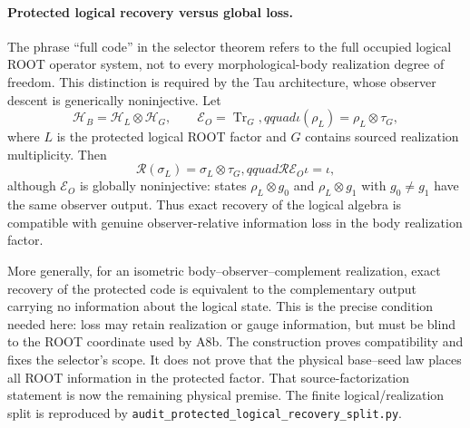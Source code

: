 \paragraph{Protected logical recovery versus global loss.}
The phrase ``full code'' in the selector theorem refers to the full occupied
logical ROOT operator system, not to every morphological-body realization
degree of freedom. This distinction is required by the Tau architecture,
whose observer descent is generically noninjective. Let
\begin{equation}
 \mathcal H_B=\mathcal H_L\otimes\mathcal H_G,\qquad
 \mathcal E_O=\operatorname{Tr}_G,qquad
 \iota(\rho_L)=\rho_L\otimes\tau_G,
 \label{eq:protectedfactor}
\end{equation}
where $L$ is the protected logical ROOT factor and $G$ contains sourced
realization multiplicity. Then
\begin{equation}
 \mathcal R(\sigma_L)=\sigma_L\otimes\tau_G,qquad
 \mathcal R\mathcal E_O\iota=\iota,
 \label{eq:protectedrecovery}
\end{equation}
although $\mathcal E_O$ is globally noninjective: states
$\rho_L\otimes g_0$ and $\rho_L\otimes g_1$ with $g_0\neq g_1$ have the same
observer output. Thus exact recovery of the logical algebra is compatible
with genuine observer-relative information loss in the body realization
factor.

More generally, for an isometric body--observer--complement realization,
exact recovery of the protected code is equivalent to the complementary
output carrying no information about the logical state. This is the precise
condition needed here: loss may retain realization or gauge information, but
must be blind to the ROOT coordinate used by A8b. The construction proves
compatibility and fixes the selector's scope. It does not prove that the
physical base--seed law places all ROOT information in the protected factor.
That source-factorization statement is now the remaining physical premise.
The finite logical/realization split is reproduced by
\texttt{audit\_protected\_logical\_recovery\_split.py}.

